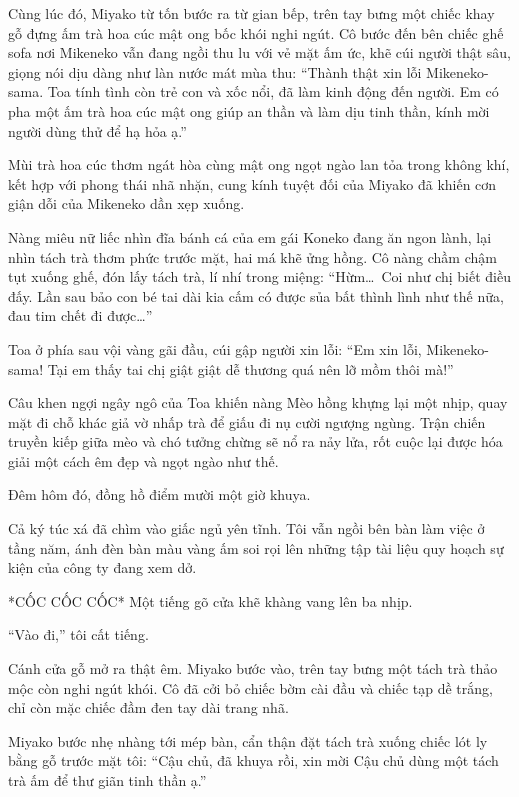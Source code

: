 \documentclass[../main.tex]{subfiles}
\begin{document}
Cùng lúc đó, Miyako từ tốn bước ra từ gian bếp, trên tay bưng một chiếc khay gỗ đựng ấm trà hoa cúc mật ong bốc khói nghi ngút. Cô bước đến bên chiếc ghế sofa nơi Mikeneko vẫn đang ngồi thu lu với vẻ mặt ấm ức, khẽ cúi người thật sâu, giọng nói dịu dàng như làn nước mát mùa thu: ``Thành thật xin lỗi Mikeneko-sama. Toa tính tình còn trẻ con và xốc nổi, đã làm kinh động đến người. Em có pha một ấm trà hoa cúc mật ong giúp an thần và làm dịu tinh thần, kính mời người dùng thử để hạ hỏa ạ.''

Mùi trà hoa cúc thơm ngát hòa cùng mật ong ngọt ngào lan tỏa trong không khí, kết hợp với phong thái nhã nhặn, cung kính tuyệt đối của Miyako đã khiến cơn giận dỗi của Mikeneko dần xẹp xuống.

Nàng miêu nữ liếc nhìn đĩa bánh cá của em gái Koneko đang ăn ngon lành, lại nhìn tách trà thơm phức trước mặt, hai má khẽ ửng hồng. Cô nàng chầm chậm tụt xuống ghế, đón lấy tách trà, lí nhí trong miệng: ``Hừm\dots\ Coi như chị biết điều đấy. Lần sau bảo con bé tai dài kia cấm có được sủa bất thình lình như thế nữa, đau tim chết đi được\dots''

Toa ở phía sau vội vàng gãi đầu, cúi gập người xin lỗi: ``Em xin lỗi, Mikeneko-sama! Tại em thấy tai chị giật giật dễ thương quá nên lỡ mồm thôi mà!''

Câu khen ngợi ngây ngô của Toa khiến nàng Mèo hồng khựng lại một nhịp, quay mặt đi chỗ khác giả vờ nhấp trà để giấu đi nụ cười ngượng ngùng. Trận chiến truyền kiếp giữa mèo và chó tưởng chừng sẽ nổ ra nảy lửa, rốt cuộc lại được hóa giải một cách êm đẹp và ngọt ngào như thế.

\ct

Đêm hôm đó, đồng hồ điểm mười một giờ khuya.

Cả ký túc xá đã chìm vào giấc ngủ yên tĩnh. Tôi vẫn ngồi bên bàn làm việc ở tầng năm, ánh đèn bàn màu vàng ấm soi rọi lên những tập tài liệu quy hoạch sự kiện của công ty đang xem dở.

*CỐC CỐC CỐC* Một tiếng gõ cửa khẽ khàng vang lên ba nhịp.

``Vào đi,'' tôi cất tiếng.

Cánh cửa gỗ mở ra thật êm. Miyako bước vào, trên tay bưng một tách trà thảo mộc còn nghi ngút khói. Cô đã cởi bỏ chiếc bờm cài đầu và chiếc tạp dề trắng, chỉ còn mặc chiếc đầm đen tay dài trang nhã.

Miyako bước nhẹ nhàng tới mép bàn, cẩn thận đặt tách trà xuống chiếc lót ly bằng gỗ trước mặt tôi: ``Cậu chủ, đã khuya rồi, xin mời Cậu chủ dùng một tách trà ấm để thư giãn tinh thần ạ.''
\end{document}
